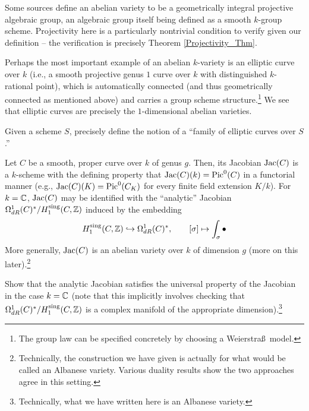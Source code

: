 \documentclass[11pt]{article}
\begin{document}
\begin{remark}
Some sources define an abelian variety to be a geometrically integral projective algebraic group, an algebraic group itself being defined as a smooth $k$-group scheme. Projectivity here is a particularly nontrivial condition to verify given our definition -- the verification is precisely Theorem \ref{Projectivity_Thm}.
\end{remark}

\begin{example}
Perhaps the most important example of an abelian $k$-variety is an elliptic curve over $k$ (i.e., a smooth projective genus $1$ curve over $k$ with distinguished $k$-rational point), which is automatically connected (and thus geometrically connected as mentioned above) and carries a group scheme structure.\footnote{The group law can be specified concretely by choosing a Weierstra\ss\, model.} We see that elliptic curves are precisely the $1$-dimensional abelian varieties.
\end{example}

\begin{exercise}
Given a scheme $S$, precisely define the notion of a ``family of elliptic curves over $S$.''
\end{exercise}

\begin{example}
Let $C$ be a smooth, proper curve over $k$ of genus $g$. Then, its Jacobian $\operatorname{Jac}(C)$ is a $k$-scheme with the defining property that $\operatorname{Jac}(C)(k)=\operatorname{Pic}^0(C)$ in a functorial manner (e.g., $\operatorname{Jac}(C)(K)=\operatorname{Pic}^0(C_K)$ for every finite field extension $K/k$). For $k=\mathbb{C}$, $\operatorname{Jac}(C)$ may be identified with the ``analytic'' Jacobian $\Omega_{dR}^1(C)^*/H_1^{\operatorname{sing}}(C,\mathbb{Z})$ induced by the embedding 
$$H_1^{\operatorname{sing}}(C,\mathbb{Z})\hookrightarrow\Omega_{dR}^1(C)^*,\qquad[\sigma]\mapsto\int_{\sigma}\bullet$$
More generally, $\operatorname{Jac}(C)$ is an abelian variety over $k$ of dimension $g$ (more on this later).\footnote{Technically, the construction we have given is actually for what would be called an Albanese variety. Various duality results show the two approaches agree in this setting.}
\end{example}

\begin{exercise}
Show that the analytic Jacobian satisfies the universal property of the Jacobian in the case $k=\mathbb{C}$ (note that this implicitly involves checking that $\Omega_{dR}^1(C)^*/H_1^{\operatorname{sing}}(C,\mathbb{Z})$ is a complex manifold of the appropriate dimension).\footnote{Technically, what we have written here is an Albanese variety. }
\end{exercise}
\end{document}
